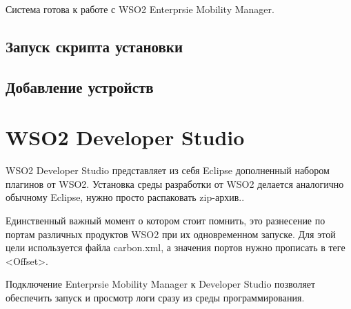 \documentclass[a4paper, 12pt]{article}		%
\begin{document}
Система готова к работе с WSO2 Enterprsie Mobility Manager.

\subsection{Запуск скрипта установки}

\subsection{Добавление устройств}

\section{WSO2 Developer Studio}

WSO2 Developer Studio представляет из себя Eclipse дополненный набором плагинов от WSO2. Установка среды разработки от WSO2 делается аналогично обычному Eclipse, нужно просто распаковать zip-архив..

Единственный важный момент о котором стоит помнить, это разнесение по портам различных продуктов WSO2 при их одновременном запуске. Для этой цели используется файла carbon.xml, а значения портов нужно прописать в теге <Offset>.

Подключение Enterprsie Mobility Manager к Developer Studio позволяет обеспечить запуск и просмотр логи сразу из среды программирования.



\end{document}
